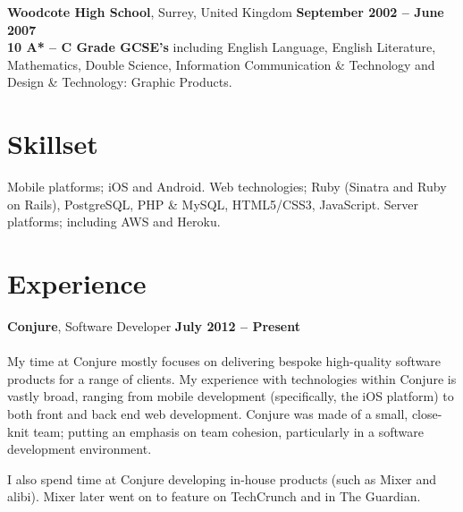 \documentclass[margin,line,a4paper]{resume}
\begin{document}
\begin{resume}
    	\textbf{Woodcote High School}, Surrey, United Kingdom	\hfill		\textbf{ September 2002 -- June 2007} 			\vspace{3mm}\\
	\vspace{1mm}%
	\textbf{10 A* -- C Grade GCSE’s} including English Language, English Literature, Mathematics, Double Science, Information Communication \& Technology and Design \& Technology: Graphic Products.	
	\vspace{1mm}

    	\section{\mysidestyle Skillset}

	Mobile platforms; iOS and Android. Web technologies; Ruby (Sinatra and Ruby on Rails), PostgreSQL, PHP \& MySQL, HTML5/CSS3, JavaScript. Server platforms; including AWS and Heroku.

    	

	 \section{\mysidestyle Experience} 

	\textbf{Conjure}, Software Developer  \hfill \textbf{July 2012 -- Present}\\ 
	\vspace{-3mm}\\\vspace{0mm}%
My time at Conjure mostly focuses on delivering bespoke high-quality software products for a range of clients.  My experience with technologies within Conjure is vastly broad, ranging from mobile development (specifically, the iOS platform) to both front and back end web development.  Conjure was made of a small, close-knit team; putting an emphasis on team cohesion, particularly in a software development environment.

I also spend time at Conjure developing in-house products (such as Mixer and alibi).  Mixer later went on to feature on TechCrunch and in The Guardian.

	

\end{resume}
\end{document}
